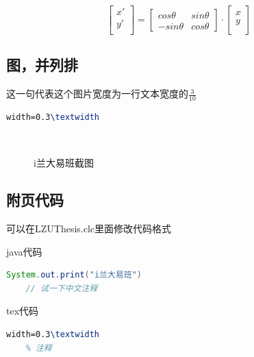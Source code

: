 \documentclass[AutoFakeBold]{LZUThesis2007}
\begin{document}
\begin{equation}
    \left[ 
    \begin{array}{c}
    x'\\
    y'\\
    \end{array}
    \right]=
    \left[ 
    \begin{array}{cc}
    cos \theta & sin \theta \\
    - sin \theta & cos \theta 
    \end{array}
    \right]
    \cdot
    \left[ 
    \begin{array}{c}
        x\\
        y\\
    \end{array}
    \right]
\end{equation}


\subsection{图，并列排} %
\label{sub:图_并列排}

这一句代表这个图片宽度为一行文本宽度的$\frac{3}{10}$
\begin{lstlisting}[language = tex]
width=0.3\textwidth
\end{lstlisting}



\begin{figure}[H]
	\centering
	\\	
    \caption{i兰大易班截图}
    \label{fig_ldr}
\end{figure}



\subsection{附页代码} %
\label{sub:附页代码}
可以在LZUThesis.clc里面修改代码格式

java代码
\begin{lstlisting}[language = java]
    System.out.print("i兰大易班")
    // 试一下中文注释
\end{lstlisting}


tex代码
\begin{lstlisting}[language = tex]
    width=0.3\textwidth
    % 注释
\end{lstlisting}
\end{document}
